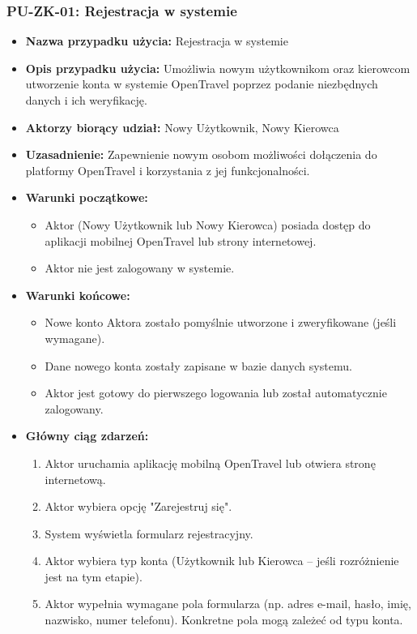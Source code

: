 \documentclass[a4paper,12pt]{article}
\begin{document}
\subsubsection{PU-ZK-01: Rejestracja w systemie}
\begin{itemize}
    \item \textbf{Nazwa przypadku użycia:} Rejestracja w systemie
    \item \textbf{Opis przypadku użycia:} Umożliwia nowym użytkownikom oraz kierowcom utworzenie konta w systemie OpenTravel poprzez podanie niezbędnych danych i ich weryfikację.
    \item \textbf{Aktorzy biorący udział:} Nowy Użytkownik, Nowy Kierowca
    \item \textbf{Uzasadnienie:} Zapewnienie nowym osobom możliwości dołączenia do platformy OpenTravel i korzystania z jej funkcjonalności.
    \item \textbf{Warunki początkowe:}
        \begin{itemize}
            \item Aktor (Nowy Użytkownik lub Nowy Kierowca) posiada dostęp do aplikacji mobilnej OpenTravel lub strony internetowej.
            \item Aktor nie jest zalogowany w systemie.
        \end{itemize}
    \item \textbf{Warunki końcowe:}
        \begin{itemize}
            \item Nowe konto Aktora zostało pomyślnie utworzone i zweryfikowane (jeśli wymagane).
            \item Dane nowego konta zostały zapisane w bazie danych systemu.
            \item Aktor jest gotowy do pierwszego logowania lub został automatycznie zalogowany.
        \end{itemize}
    \item \textbf{Główny ciąg zdarzeń:}
        \begin{enumerate}
            \item Aktor uruchamia aplikację mobilną OpenTravel lub otwiera stronę internetową.
            \item Aktor wybiera opcję "Zarejestruj się".
            \item System wyświetla formularz rejestracyjny.
            \item Aktor wybiera typ konta (Użytkownik lub Kierowca – jeśli rozróżnienie jest na tym etapie).
            \item Aktor wypełnia wymagane pola formularza (np. adres e-mail, hasło, imię, nazwisko, numer telefonu). Konkretne pola mogą zależeć od typu konta.

\end{enumerate}
\end{itemize}
\end{document}
